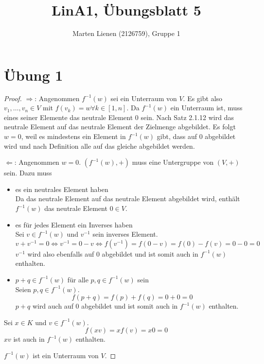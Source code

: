 \documentclass[a4paper,10pt]{article}
\title{LinA1, Übungsblatt 5}
\author{Marten Lienen (2126759), Gruppe 1}
\begin{document}
\maketitle

\section*{Übung 1}

\begin{proof}
 $\Rightarrow$: Angenommen $f^{-1}(w)$ sei ein Unterraum von $V$.
 Es gibt also $v_1, \dots, v_n \in V$ mit $f(v_k) = w \forall k \in [1, n]$.
 Da $f^{-1}(w)$ ein Unterraum ist, muss eines seiner Elemente das neutrale Element $0$ sein.
 Nach Satz 2.1.12 wird das neutrale Element auf das neutrale Element der Zielmenge abgebildet.
 Es folgt $w = 0$, weil es mindestens ein Element in $f^{-1}(w)$ gibt, dass auf $0$ abgebildet wird und nach Definition alle auf das gleiche abgebildet werden.
 
 $\Leftarrow$: Angenommen $w = 0$.
 $(f^{-1}(w), +)$ muss eine Untergruppe von $(V, +)$ sein.
 Dazu muss
 \begin{itemize}
  \item es ein neutrales Element haben\\
  Da das neutrale Element auf das neutrale Element abgebildet wird, enthält $f^{-1}(w)$ das neutrale Element $0 \in V$.
  \item es für jedes Element ein Inverses haben\\
  Sei $v \in f^{-1}(w)$ und $v^{-1}$ sein inverses Element.
  \begin{equation*}
   v + v^{-1} = 0 \Leftrightarrow v^{-1} = 0 - v \Leftrightarrow f(v^{-1}) = f(0 - v) = f(0) - f(v) = 0 - 0 = 0
  \end{equation*}
  $v^{-1}$ wird also ebenfalls auf $0$ abgebildet und ist somit auch in $f^{-1}(w)$ enthalten.
  \item $p + q \in f^{-1}(w)$ für alle $p, q \in f^{-1}(w)$ sein\\
  Seien $p, q \in f^{-1}(w)$.
  \begin{equation*}
   f(p + q) = f(p) + f(q) = 0 + 0 = 0
  \end{equation*}
  $p + q$ wird auch auf $0$ abgebildet und ist somit auch in $f^{-1}(w)$ enthalten.
 \end{itemize}
 Sei $x \in K$ und $v \in f^{-1}(w)$.
 \begin{equation*}
  f(xv) = xf(v) = x0 = 0
 \end{equation*}
 $xv$ ist auch in $f^{-1}(w)$ enthalten.
 
 $f^{-1}(w)$ ist ein Unterraum von $V$.
\end{proof}
\end{document}
